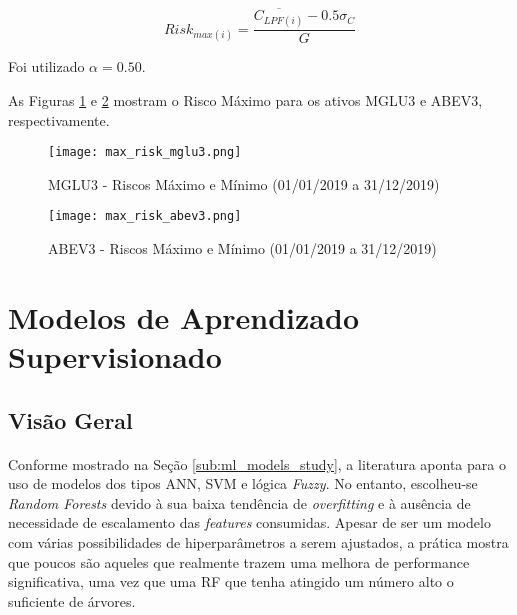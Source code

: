 \begin{itemize}
    \begin{equation} \label{eq:44}
        Risk_{max(i)} = \dfrac{\overline{C_{LPF(i)}} - 0.5 \sigma_{C}}{G}
    \end{equation}

    Foi utilizado \begin{math} \alpha = 0.50 \end{math}.

    As Figuras \ref{fig:108} e \ref{fig:270} mostram o Risco Máximo para os ativos MGLU3 e ABEV3, respectivamente.

    \begin{figure}[!htb]
        \texttt{[image: max\_risk\_mglu3.png]}
        \centering
        \caption{MGLU3 - Riscos Máximo e Mínimo (01/01/2019 a 31/12/2019)}
        \label{fig:108}
    \end{figure}

    \begin{figure}[!htb]
        \texttt{[image: max\_risk\_abev3.png]}
        \centering
        \caption{ABEV3 - Riscos Máximo e Mínimo (01/01/2019 a 31/12/2019)}
        \label{fig:270}
    \end{figure}

\end{itemize}




\FloatBarrier
\section{Modelos de Aprendizado Supervisionado}
\label{sub:super_models}


\FloatBarrier
\subsection{Visão Geral}

\paragraph{} Conforme mostrado na Seção \ref{sub:ml_models_study}, a literatura aponta para o uso de modelos dos tipos ANN, SVM e lógica \textit{Fuzzy}. No entanto, escolheu-se \textit{Random Forests} devido à sua baixa tendência de \textit{overfitting} e à ausência de necessidade de escalamento das \textit{features} consumidas. Apesar de ser um modelo com várias possibilidades de hiperparâmetros a serem ajustados, a prática mostra que poucos são aqueles que realmente trazem uma melhora de performance significativa, uma vez que uma RF que tenha atingido um número alto o suficiente de árvores.

